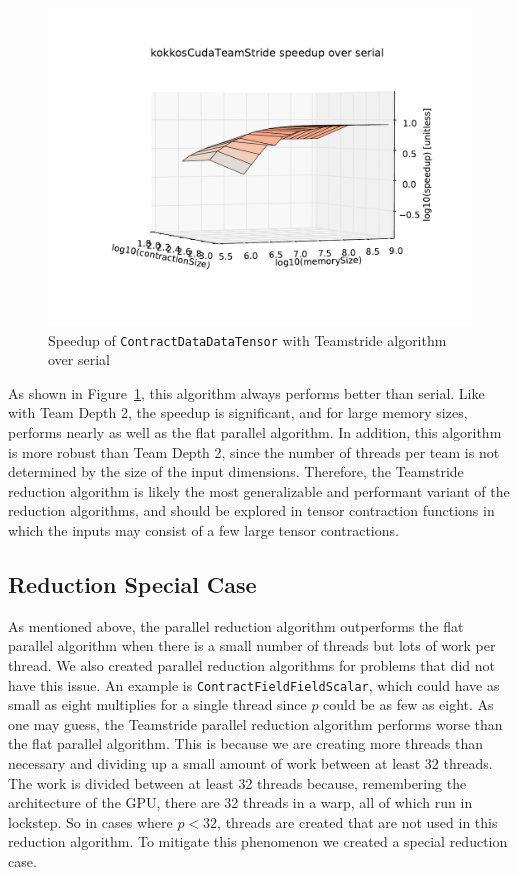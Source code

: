 \begin{figure}[ht]
    \includegraphics[scale=.55]{./VersusSerial_kokkosCudaTeamStride_clearCache_shadowfax}
    \caption[Performance of \texttt{ContractDataDataTensor} Teamstride]{Speedup
        of \texttt{ContractDataDataTensor} with Teamstride algorithm over serial
\label{fig:ContractDataDataTensorTeamstride}} 
\end{figure}

As shown in Figure~\ref{fig:ContractDataDataTensorTeamstride}, this algorithm
always performs better than serial.  Like with Team Depth 2, the speedup is
significant, and for large memory sizes, performs nearly as well as the flat
parallel algorithm.  In addition, this algorithm is more robust than Team Depth
2, since the number of threads per team is not determined by the size of the
input dimensions.  Therefore, the Teamstride reduction algorithm is likely the
most generalizable and performant variant of the reduction algorithms, and
should be explored in tensor contraction functions in which the inputs may
consist of a few large tensor contractions.

\subsection{Reduction Special Case}
As mentioned above, the parallel reduction algorithm outperforms the flat
parallel algorithm when there is a small number of threads but lots of work per
thread. We also created parallel reduction algorithms for problems that did not
have this issue. An example is \texttt{ContractFieldFieldScalar}, which could have as
small as eight multiplies for a single thread since $p$ could be as few as
eight. As one may guess, the Teamstride parallel reduction algorithm performs
worse than the flat parallel algorithm. This is because we are creating more
threads than necessary and dividing up a small amount of work between at least
32 threads. The work is divided between at least 32 threads because, remembering
the architecture of the GPU, there are 32 threads in a warp, all of which run in
lockstep. So in cases where $p < 32$, threads are created that are not used in
this reduction algorithm. To mitigate this phenomenon we created a special
reduction case.

